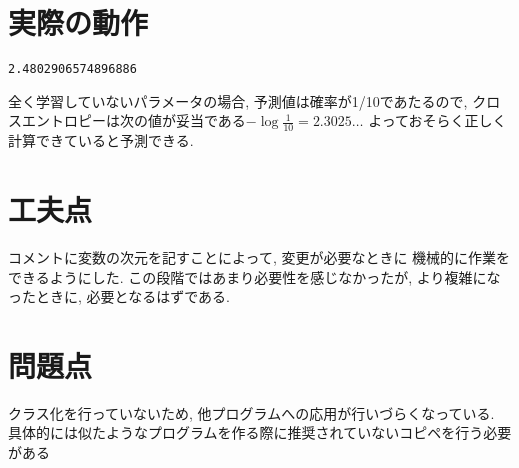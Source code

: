 \documentclass[a4paper,11pt]{jsarticle}
\begin{document}
\section{実際の動作}
\begin{lstlisting}[caption=Actual Move]
  2.4802906574896886
\end{lstlisting}
全く学習していないパラメータの場合, 予測値は確率が1/10であたるので,
クロスエントロピーは次の値が妥当である$-\log{\frac{1}{10}} = 2.3025\dots$
よっておそらく正しく計算できていると予測できる.

\section{工夫点}
コメントに変数の次元を記すことによって, 変更が必要なときに
機械的に作業をできるようにした. この段階ではあまり必要性を感じなかったが, 
より複雑になったときに, 必要となるはずである.

\section{問題点}
クラス化を行っていないため, 他プログラムへの応用が行いづらくなっている.
具体的には似たようなプログラムを作る際に推奨されていないコピペを行う必要がある
\end{document}
